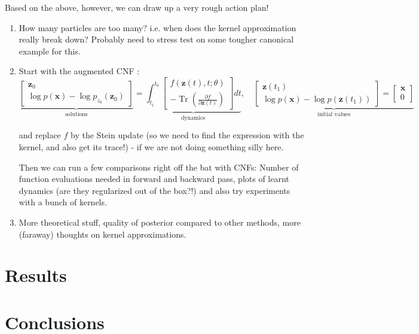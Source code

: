 \documentclass[12pt]{article}
\renewcommand{\[}{\left[}
\renewcommand{\]}{\right]}
\renewcommand{\(}{\left(}
\renewcommand{\)}{\right)}
\begin{document}
Based on the above, however, we can draw up a very rough action plan!

\begin{enumerate}
    \item How many particles are too many? i.e. when does the kernel approximation really break down? Probably need to stress test on some tougher canonical example for this.

    \item Start with the augmented CNF \cite{grathwohl_ffjord_2018}:
    $$\underbrace{\begin{bmatrix}\mathbf{z}_0\\\log p(\mathbf{x})-\log p_{z_0}(\mathbf{z}_0)\end{bmatrix}}_{\text{solutions}}=\underbrace{\int_{t_1}^{t_0}\begin{bmatrix}f(\mathbf{z}(t),t;\theta)\\-\operatorname{Tr}\left(\frac{\partial f}{\partial\mathbf{z}(t)}\right)\end{bmatrix}dt}_{\text{dynamics}},\quad\underbrace{\begin{bmatrix}\mathbf{z}(t_1)\\\log p(\mathbf{x})-\log p(\mathbf{z}(t_1))\end{bmatrix}=\begin{bmatrix}\mathbf{x}\\0\end{bmatrix}}_{\text{initial values}}$$

    and replace $f$ by the Stein update (so we need to find the expression with the kernel, and also get its trace!) - if we are not doing something silly here.

    Then we can run a few comparisons right off the bat with CNFs: Number of function evaluations needed in forward and backward pass, plots of learnt dynamics (are they regularized out of the box?!) and also try experiments with a bunch of kernels.

    \item More theoretical stuff, quality of posterior compared to other methods, more (faraway) thoughts on kernel approximations.
\end{enumerate}

\section{Results}

\section{Conclusions}



\end{document}
